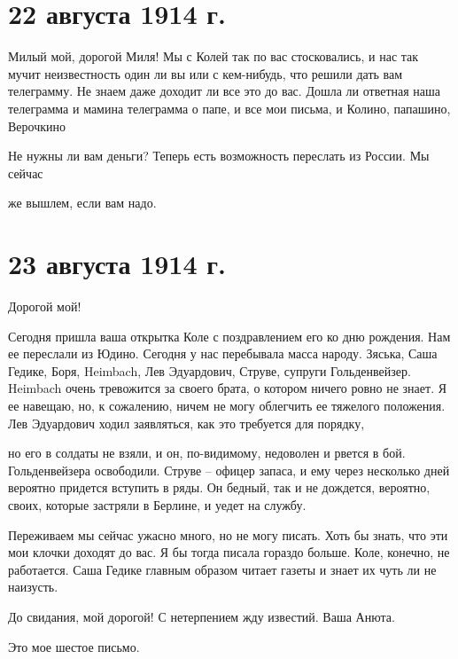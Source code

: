 \section{22 августа 1914 г.}


Милый мой, дорогой Миля! Мы с Колей так по вас стосковались, и нас так мучит
неизвестность один ли вы или с кем-нибудь, что решили дать вам телеграмму. Не
знаем даже доходит ли все это до вас. Дошла ли ответная наша телеграмма и
мамина телеграмма о папе, и все мои письма, и Колино, папашино,
Верочкино\textellipsis

Не нужны ли вам деньги? Теперь есть возможность переслать из России. Мы сейчас


\noindent
же вышлем, если вам надо.

\section{23 августа 1914 г.}


Дорогой мой!

Сегодня пришла ваша открытка Коле с поздравлением его ко дню рождения. Нам ее
переслали из Юдино. Сегодня у нас перебывала масса народу. Зяська, Саша Гедике,
Боря, Heimbach, Лев Эдуардович, Струве, супруги Гольденвейзер. Heimbach очень
тревожится за своего брата, о котором ничего ровно не знает. Я ее навещаю, но,
к сожалению, ничем не могу облегчить ее тяжелого положения. Лев Эдуардович
ходил заявляться, как это требуется для порядку,


\noindent
но его в солдаты не взяли, и он, по-видимому, недоволен и рвется в бой.
Гольденвейзера освободили. Струве -- офицер запаса, и ему через несколько дней
вероятно придется вступить в ряды. Он бедный, так и не дождется, вероятно,
своих, которые застряли в Берлине, и уедет на службу.

Переживаем мы сейчас ужасно много, но не могу писать. Хоть бы знать, что эти
мои клочки доходят до вас. Я бы тогда писала гораздо больше. Коле, конечно, не
работается. Саша Гедике главным образом читает газеты и знает их чуть ли не
наизусть.


До свидания, мой дорогой! С нетерпением жду известий. Ваша Анюта.

Это мое шестое письмо.
